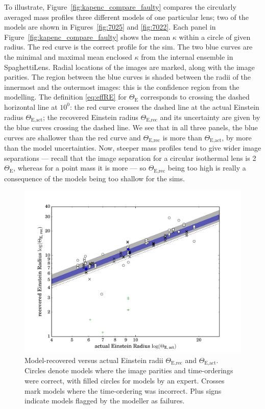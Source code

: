 \documentclass[usenatbib]{mn2e}
\newcommand{\spl}{SpaghettiLens\xspace}
\newcommand{\ERf}[1][]{$\Theta_\text{E#1}$\xspace} %
\newcommand{\figref}[1]{Figure~\ref{fig:#1}}
\newcommand{\phil}[1]{\noindent\textcolor{purple}{\bf #1}}
\let\phil\relax
\begin{document}
To illustrate, \figref{kapenc_compare_faulty} compares the circularly
averaged mass profiles three different models of one particular lens;
two of the models are shown in Figures~\ref{fig:7025} and
\ref{fig:7022}. Each panel in \figref{kapenc_compare_faulty} shows the
mean $\kappa$ within a circle of given radius.  The red curve is the
correct profile for the sim.  The two blue curves are the minimal and
maximal mean enclosed $\kappa$ from the internal ensemble in \spl.
Radial locations of the images are marked, along with the image
parities.  The region between the blue curves is shaded between the
radii of the innermost and the outermost images: this is the
confidence region from the modelling.  The definition \eqref{eq:effRE}
for \ERf corresponds to crossing the dashed horizontal line at $10^0$:
the red curve crosses the dashed line at the actual Einstein radius
\ERf[,act]; the recovered Einstein radius \ERf[,rec] and its
uncertainty are given by the blue curves crossing the dashed line.  We
see that in all three panels, the blue curves are shallower than the
red curve and \ERf[,rec] is more than \ERf[,act], by more than the
model uncertainties.  Now, steeper mass profiles tend to give wider
image separations --- recall that the image separation for a circular
isothermal lens is 2\ERf, whereas for a point mass it is more
\citep[see, e.g.,][]{2002LNP...608....1C} --- so \ERf[,rec] being too
high is really a consequence of the \phil{GLASS} models being too shallow for
the sims.

\begin{figure}
  \centering
    \includegraphics[width=0.90\linewidth]{fig/eR_5}
  \caption{Model-recovered versus actual Einstein radii \ERf[,rec] and
    \ERf[,act].  Circles denote models where the image parities and
    time-orderings were correct, with filled circles for models by an
    expert.  Crosses mark models where the time-ordering was
    incorrect.  Plus signs indicate models flagged by the modeller as
    failures.}
  \label{fig:ER_per_sim}
\end{figure}
\end{document}

